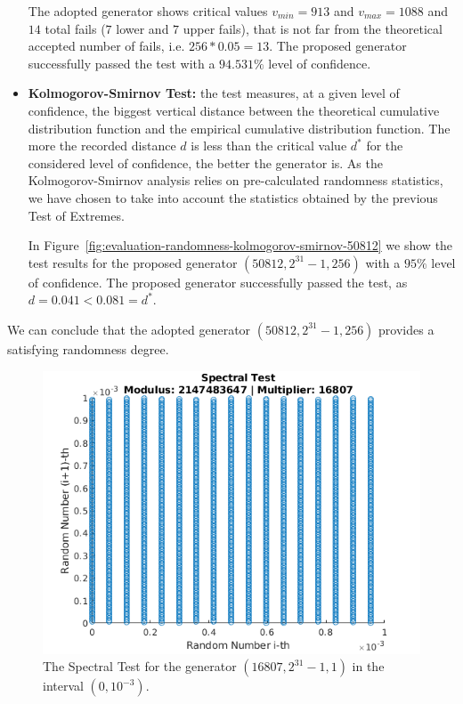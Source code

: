 \begin{itemize}
	The adopted generator shows critical values $v_{min}=913$ and $v_{max}=1088$ and $14$ total fails ($7$ lower and $7$ upper fails), that is not far from the theoretical accepted number of fails, i.e. $256*0.05=13$.
	The proposed generator successfully passed the test with a $94.531\%$ level of confidence.
	
	\item \textbf{Kolmogorov-Smirnov Test:} the test measures, at a given level of confidence, the biggest vertical distance between the theoretical cumulative distribution function and the empirical cumulative distribution function.
	The more the recorded distance $d$ is less than the critical value $d^*$ for the considered level of confidence, the better the generator is.
	As the Kolmogorov-Smirnov analysis relies on pre-calculated randomness statistics, we have chosen to take into account the statistics obtained by the previous Test of Extremes.
	
	In Figure~\ref{fig:evaluation-randomness-kolmogorov-smirnov-50812} we show the test results for the proposed generator $(50812,2^{31}-1, 256)$ with a $95\%$ level of confidence.
	The proposed generator successfully passed the test, as $d=0.041<0.081=d^*$.
	
\end{itemize}

We can conclude that the adopted generator $(50812,2^{31}-1, 256)$ provides a satisfying randomness degree.

\begin{figure}
	\includegraphics[width=\columnwidth]{fig/evaluation-randomness-spectral-16807}
	\caption{The Spectral Test for the generator $(16807,2^{31}-1, 1)$ in the interval $(0, 10^{-3})$.}
	\label{fig:evaluation-randomness-spectral-16807}
\end{figure}

